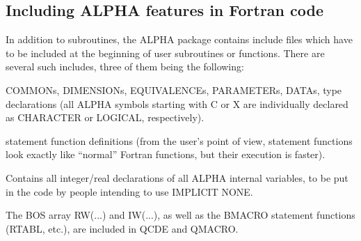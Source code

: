 \subsection{\label{sec-UA}Including ALPHA features in Fortran code}
\par
In addition to subroutines, the ALPHA package contains include files
which have to be included at the beginning of
user subroutines or functions.
There are several such includes, three of them being the following:
\begin{indentlist}{ 2.50cm}{ 2.75cm}
COMMONs, DIMENSIONs, EQUIVALENCEs, PARAMETERs, DATAs,
type declarations (all ALPHA symbols starting with C or X are
individually declared as CHARACTER or LOGICAL, respectively).
 
statement function definitions (from the user's point of
view, statement functions look exactly like ``normal'' Fortran
functions, but their execution is faster).


Contains all integer/real declarations of all ALPHA internal variables,
to be put in the code by people intending to use IMPLICIT NONE.

\end{indentlist}
The BOS array RW(...) and IW(...), as well as
the BMACRO statement functions (RTABL, etc.), are included in QCDE
and
QMACRO.
 
